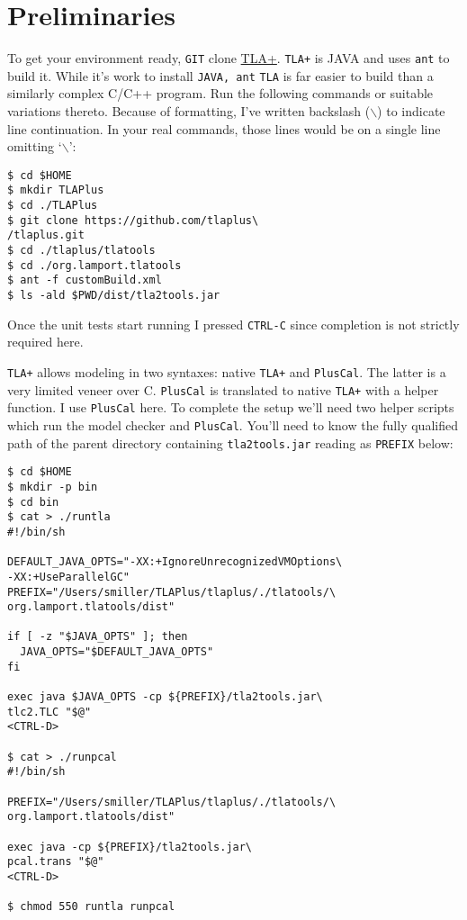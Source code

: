 \documentclass[twocolumn]{article}
\begin{document}
\section{Preliminaries}
To get your environment ready, \texttt{GIT} clone \href{https://github.com/tlaplus/tlaplus.git}{TLA+}. \texttt{TLA+} is JAVA and uses \texttt{ant} to build it. While it's work to install \texttt{JAVA, ant} \texttt{TLA} is far easier to build than a similarly complex C/C++ program. Run the following commands or suitable variations thereto. Because of formatting, I've written backslash ($\backslash$) to indicate line continuation. In your real commands, those lines would be on a single line omitting `$\backslash$':

\begin{verbatim}
$ cd $HOME
$ mkdir TLAPlus
$ cd ./TLAPlus
$ git clone https://github.com/tlaplus\
/tlaplus.git
$ cd ./tlaplus/tlatools
$ cd ./org.lamport.tlatools
$ ant -f customBuild.xml
$ ls -ald $PWD/dist/tla2tools.jar
\end{verbatim}

\noindent Once the unit tests start running I pressed \texttt{CTRL-C} since completion is not strictly required here.

\texttt{TLA+} allows modeling in two syntaxes: native \texttt{TLA+} and \texttt{PlusCal}. The latter is a very limited veneer over C. \texttt{PlusCal} is translated to native \texttt{TLA+} with a helper function. I use \texttt{PlusCal} here. To complete the setup we'll need two helper scripts which run the model checker and \texttt{PlusCal}. You'll need to know the fully qualified path of the parent directory containing \texttt{tla2tools.jar} reading as \texttt{PREFIX} below:

\begin{verbatim}
$ cd $HOME
$ mkdir -p bin
$ cd bin
$ cat > ./runtla
#!/bin/sh

DEFAULT_JAVA_OPTS="-XX:+IgnoreUnrecognizedVMOptions\
-XX:+UseParallelGC"
PREFIX="/Users/smiller/TLAPlus/tlaplus/./tlatools/\
org.lamport.tlatools/dist"

if [ -z "$JAVA_OPTS" ]; then
  JAVA_OPTS="$DEFAULT_JAVA_OPTS"
fi

exec java $JAVA_OPTS -cp ${PREFIX}/tla2tools.jar\
tlc2.TLC "$@"
<CTRL-D>

$ cat > ./runpcal
#!/bin/sh

PREFIX="/Users/smiller/TLAPlus/tlaplus/./tlatools/\
org.lamport.tlatools/dist"

exec java -cp ${PREFIX}/tla2tools.jar\
pcal.trans "$@"
<CTRL-D>

$ chmod 550 runtla runpcal
\end{verbatim}
\end{document}
